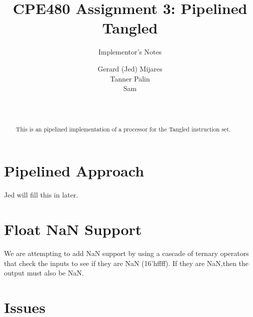 \documentclass{sig-alternate-05-2015}
\begin{document}

\title{CPE480 Assignment 3: Pipelined Tangled }
\subtitle{Implementor's Notes}

\author{
Gerard (Jed) Mijares\\
Tanner Palin\\
Sam\\
       \\
       \\
}

\maketitle
\begin{abstract}
This is an pipelined implementation of a processor for the Tangled instruction set. 
\end{abstract}

\section{Pipelined Approach}

Jed will fill this in later.


\section{Float NaN Support}

We are attempting to add NaN support by using a cascade of ternary operators that check the inputs to see if they are NaN (16'hffff). If they are NaN,then the output must also be NaN.

\section{Issues}
\end{document}
